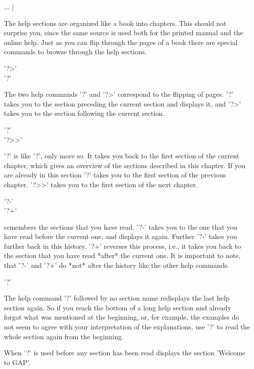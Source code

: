     ... |

%

The help  sections are organized like  a book into chapters.  This should
not  surprise you, since   the same source  is used  both for the printed
manual and the online help.  Just as you can flip  through the pages of a
book there are special commands to browse through the help sections.

'?>' \\
'?\<'

The two help commands '?\<' and '?>' correspond to the flipping of pages.
'?\<' takes you to the section preceding the current section and displays
it, and '?>' takes you to the section following the current section.

'?\<\<' \\
'?>>'

'?\<\<' is like '?\<',  only  more so.  It   takes you back to  the first
section of the current  chapter, which gives an  overview of the sections
described in  this chapter.  If you  are already in  this section '?\<\<'
takes you to the first section of  the previous chapter.  '?>>' takes you
to the first section of the next chapter.

'?-'\\
'?+'

{\GAP} remembers the sections that you have read.  '?-'  takes you to the
one that you  have read before  the  current one, and  displays it again.
Further '?-' takes you further back  in this history.  '?+' reverses this
process, i.e.,  it  takes you  back to   the section that   you have read
*after* the current one.  It is important to  note, that '?-' and '?+' do
*not* alter the history like the other help commands.

%

'?'

The help command '?' followed by no section name redisplays the last help
section again.  So  if you  reach  the bottom of  a long help section and
already forgot what  was mentioned at the beginning, or, for example, the
examples  do  not  seem  to  agree  with  your   interpretation  of   the
explanations, use '?' to read the whole section again from the beginning.

When  '?' is used before any section  has  been read {\GAP}  displays the
section 'Welcome to GAP'.

